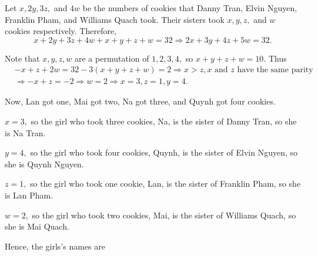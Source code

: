 \documentclass{article}
\begin{document}
\begin{soln}
    
    Let $x, 2y, 3z,$ and $4w$ be the numbers of cookies that 
    Danny Tran, Elvin Nguyen, Franklin Pham, and Williams Quach took.
    Their sisters took $x, y, z,$ and $w$ cookies respectively. Therefore,
    \[
        x + 2y + 3z + 4w + x + y + z + w = 32
        \Rightarrow 2x + 3y + 4z + 5w = 32.
    \]

    Note that $x, y, z, w$ are a permutation of $1,2,3,4,$ so $x + y + z + w = 10.$
    Thus 
    \[
        \begin{aligned}
            &-x + z + 2w = 32-3(x + y + z + w) = 2 \Rightarrow x > z, x \text{\ and\ } z \text{\ have the same parity}\\
            &\Rightarrow -x+z=-2 \Rightarrow  w=2 \Rightarrow x=3, z=1, y=4. 
        \end{aligned}
    \]

    Now, Lan got one, Mai got two, Na got three, and Quynh got four cookies.

    $x=3,$ so the girl who took three cookies, Na, is the sister of Danny Tran, so she is Na Tran.

    $y=4,$ so the girl who took four cookies, Quynh, is the sister of Elvin Nguyen, so she is Quynh Nguyen.
    
    $z=1,$ so the girl who took one cookie, Lan, is the sister of Franklin Pham, so she is Lan Pham.

    $w=2,$ so the girl who took two cookies, Mai, is the sister of Williams Quach, so she is Mai Quach.

    Hence, the girls's names are 
\end{soln}
\end{document}

